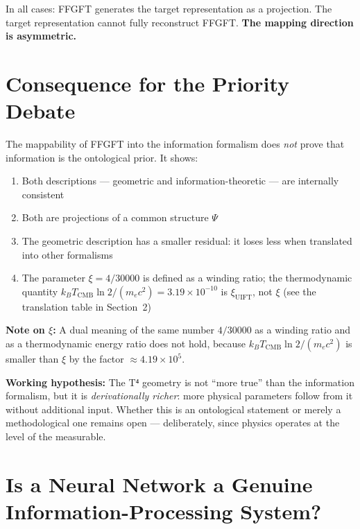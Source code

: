In all cases: FFGFT generates the target representation as a projection.
The target representation cannot fully reconstruct FFGFT.
\textbf{The mapping direction is asymmetric.}

\section{Consequence for the Priority Debate}

The mappability of FFGFT into the information formalism does \emph{not}
prove that information is the ontological prior. It shows:

\begin{enumerate}
  \item Both descriptions --- geometric and information-theoretic ---
        are internally consistent
  \item Both are projections of a common structure $\Psi$
  \item The geometric description has a smaller residual:
        it loses less when translated into other formalisms
  \item The parameter $\xi = 4/30000$ is defined as a winding ratio;
        the thermodynamic quantity $k_B T_\text{CMB} \ln 2 / (m_e c^2) = 3.19\times10^{-10}$
        is $\xi_\text{UIFT}$, not $\xi$ (see the translation table in Section~2)
\end{enumerate}

\textbf{Note on $\xi$:} A dual meaning of the same number $4/30000$ as a
winding ratio and as a thermodynamic energy ratio does not hold, because
$k_BT_\text{CMB}\ln2/(m_ec^2)$ is smaller than $\xi$ by the factor
$\approx 4.19\times10^{5}$.

\textbf{Working hypothesis:} The T⁴ geometry is not ``more true'' than
the information formalism, but it is \emph{derivationally richer}:
more physical parameters follow from it without additional input.
Whether this is an ontological statement or merely a methodological one
remains open --- deliberately, since physics operates at the level of
the measurable.


\section{Is a Neural Network a Genuine Infor\-mation-Pro\-cessing System?}


